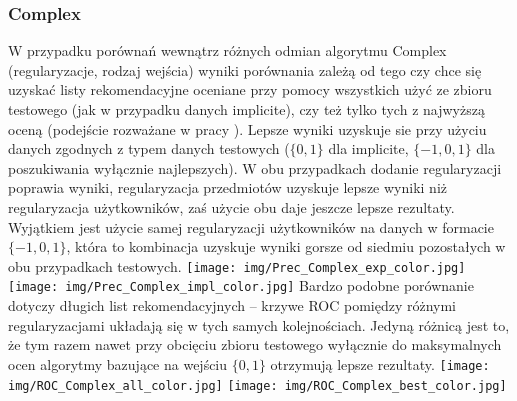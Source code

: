 \documentclass{pracamgr}
\begin{document}
    \subsubsection{Complex}
     W przypadku porównań wewnątrz różnych odmian algorytmu Complex (regularyzacje, rodzaj wejścia)
     wyniki porównania zależą od tego czy chce się uzyskać listy rekomendacyjne oceniane przy pomocy wszystkich
     użyć ze zbioru testowego (jak w przypadku danych implicite), czy też tylko tych z najwyższą oceną (podejście rozważane w pracy \cite{205}).
     Lepsze wyniki uzyskuje sie przy użyciu danych zgodnych z typem danych testowych ($\{0,1\}$ dla implicite,
     $\{-1,0,1\}$ dla poszukiwania wyłącznie najlepszych). W obu przypadkach dodanie regularyzacji poprawia wyniki,
     regularyzacja przedmiotów uzyskuje lepsze wyniki niż regularyzacja użytkowników, zaś użycie obu daje jeszcze lepsze rezultaty.
     Wyjątkiem jest użycie samej regularyzacji użytkowników na danych w formacie $\{-1,0,1\}$,
     która to kombinacja uzyskuje wyniki gorsze od siedmiu pozostałych w obu przypadkach testowych.\newline
     \texttt{[image: img/Prec\_Complex\_exp\_color.jpg]}\newline
     \texttt{[image: img/Prec\_Complex\_impl\_color.jpg]}\newline
     Bardzo podobne porównanie dotyczy długich list rekomendacyjnych -- krzywe ROC pomiędzy różnymi regularyzacjami układają się w tych samych kolejnościach.
     Jedyną różnicą jest to, że tym razem nawet przy obcięciu zbioru testowego wyłącznie do maksymalnych ocen algorytmy bazujące na wejściu $\{0,1\}$ otrzymują
     lepsze rezultaty.\newline
     \texttt{[image: img/ROC\_Complex\_all\_color.jpg]}
     \texttt{[image: img/ROC\_Complex\_best\_color.jpg]}\newline
\end{document}
